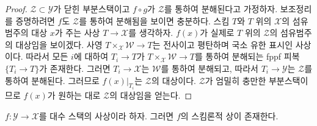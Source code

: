 \begin{proof}
$\mathcal{Z} \subset \mathcal{Y}$가 닫힌 부분스택이고 $f \circ g$가
$\mathcal{Z}$를 통하여 분해된다고 가정하자. 보조정리를 증명하려면 $f$도
$\mathcal{Z}$를 통하여 분해됨을 보이면 충분하다. 스킴 $T$와 $T$ 위의
$\mathcal{X}$의 섬유범주의 대상 $x$가 주는 사상
$T \to \mathcal{X}$를 생각하자. $f(x)$가 실제로 $T$ 위의
$\mathcal{Z}$의 섬유범주의 대상임을 보이겠다. 사영
$T \times_\mathcal{X} \mathcal{W} \to T$는 전사이고 평탄하며 국소 유한
표시인 사상이다. 따라서 모든 $i$에 대하여 $T_i \to T$가
$T \times_\mathcal{X} \mathcal{W} \to T$를 통하여 분해되는 fppf 피복
$\{T_i \to T\}$가 존재한다. 그러면 $T_i \to \mathcal{X}$는
$\mathcal{W}$를 통하여 분해되고, 따라서 $T_i \to \mathcal{Y}$는
$\mathcal{Z}$를 통하여 분해된다. 그러므로 $f(x)|_{T_i}$는
$\mathcal{Z}$의 대상이다. $\mathcal{Z}$가 엄밀히 충만한 부분스택이므로
$f(x)$가 원하는 대로 $\mathcal{Z}$의 대상임을 얻는다.
\end{proof}

\begin{lemma}
\label{lemma-scheme-theoretic-image-existence}
$f : \mathcal{Y} \to \mathcal{X}$를 대수 스택의 사상이라 하자. 그러면
$f$의 스킴론적 상이 존재한다.
\end{lemma}

